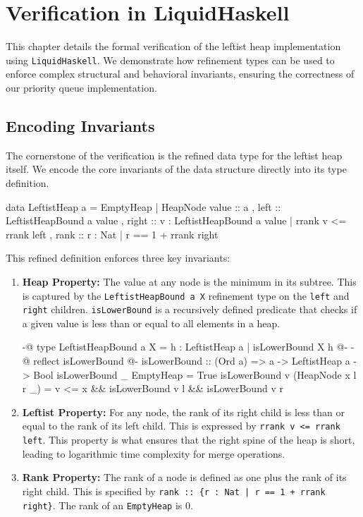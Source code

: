 \chapter{Verification in LiquidHaskell}
\label{ch:verification}
This chapter details the formal verification of the leftist heap implementation using \texttt{LiquidHaskell}. We demonstrate how refinement types can be used to enforce complex structural and behavioral invariants, ensuring the correctness of our priority queue implementation.

\section{Encoding Invariants}
The cornerstone of the verification is the refined data type for the leftist heap itself.
We encode the core invariants of the data structure directly into its type definition.

\begin{code}
  data LeftistHeap a = EmptyHeap
        | HeapNode { value :: a
           , left  :: LeftistHeapBound a value
           , right :: {v : LeftistHeapBound a value  | rrank v <= rrank left }
           , rank :: {r : Nat | r == 1 + rrank right}
          }
\end{code}

This refined definition enforces three key invariants:
\begin{enumerate}
    \item \textbf{Heap Property:} The value at any node is the minimum in its subtree.
    This is captured by the \texttt{LeftistHeapBound a X} refinement type on the \texttt{left} and \texttt{right} children.
    \texttt{isLowerBound} is a recursively defined predicate that checks if a given value is less than or equal to all elements in a heap.
    \begin{code}
  {-@ type LeftistHeapBound a X = { h : LeftistHeap a | isLowerBound X h} @-}
  {-@ reflect isLowerBound @-} 
  isLowerBound :: (Ord a) => a -> LeftistHeap a -> Bool
  isLowerBound _ EmptyHeap = True
  isLowerBound v (HeapNode x l r _) = 
      v <= x && isLowerBound v l && isLowerBound v r
    \end{code}
    
    \item \textbf{Leftist Property:} For any node, the rank of its right child is less than or equal to the rank of its left child. This is expressed by \texttt{rrank v <= rrank left}. This property is what ensures that the right spine of the heap is short, leading to logarithmic time complexity for merge operations.
    
    \item \textbf{Rank Property:} The rank of a node is defined as one plus the rank of its right child. This is specified by \texttt{rank :: \{r : Nat | r == 1 + rrank right\}}. The rank of an \texttt{EmptyHeap} is 0.
\end{enumerate}

